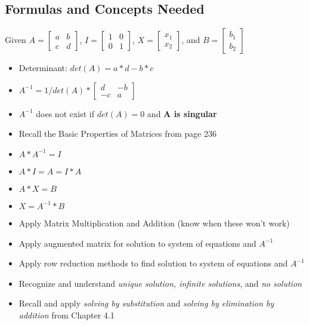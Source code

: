 \documentclass[12pt]{article}
\begin{document}
\subsection*{Formulas  and Concepts Needed}
Given $A = \begin{bmatrix}
a & b \\
c & d
\end{bmatrix}$, $I = \begin{bmatrix}
1 & 0 \\
0 & 1
\end{bmatrix}$, $X = \begin{bmatrix}
x_1 \\
x_2
\end{bmatrix}$, and $B = \begin{bmatrix}
b_1 \\
b_2
\end{bmatrix}
$

\begin{itemize}
\item Determinant: $det(A) = a*d - b*c$
\item $A^{-1} = 1/det(A) * \begin{bmatrix}
d & -b \\
-c & a
\end{bmatrix}$
\item $A^{-1}$ does not exist if $det(A)=0$ and \textbf{A is singular}
\item Recall the Basic Properties of Matrices from page 236
\item $A * A^{-1} = I$
\item $A * I = A = I*A$
\item $A*X = B$
\item $X = A^{-1}*B$
\item Apply Matrix Multiplication and Addition (know when these won't work)
\item Apply augmented matrix for solution to system of equations and $A^{-1}$
\item Apply row reduction methods to find solution to system of equations and $A^{-1}$
\item Recognize and understand \textit{unique solution, infinite solutions}, and \textit{no solution}
\item Recall and apply \textit{solving by substitution} and \textit{solving by elimination by addition} from Chapter 4.1
\end{itemize}
\end{document}

